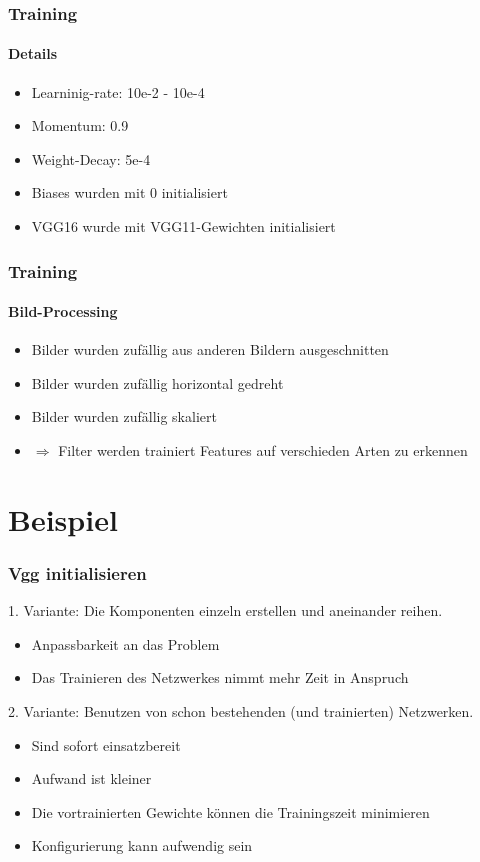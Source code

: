 \documentclass[10pt]{beamer}
\begin{document}
\begin{frame}
	\frametitle{Training}
	\framesubtitle{Details}
	\begin{itemize}
		\setlength\itemsep{1em}
		\item Learninig-rate: 10e-2 - 10e-4
		\item Momentum: 0.9
		\item Weight-Decay: 5e-4
		\item Biases wurden mit 0 initialisiert
		\item VGG16 wurde mit VGG11-Gewichten initialisiert
	\end{itemize}
\end{frame}

\begin{frame}
\frametitle{Training}
\framesubtitle{Bild-Processing}
\begin{itemize}
	\setlength\itemsep{1em}
	\item Bilder wurden zuf\"allig aus anderen Bildern ausgeschnitten
	\item Bilder wurden zuf\"allig horizontal gedreht
	\item Bilder wurden zuf\"allig skaliert
	\item[] $\Rightarrow$ Filter werden trainiert Features auf verschieden Arten zu erkennen 
\end{itemize}
\end{frame}

\section{Beispiel}

\begin{frame}
\frametitle{Vgg initialisieren}
	1. Variante: Die Komponenten einzeln erstellen und aneinander reihen.
	\begin{itemize}
		\item[] {\color{green} Anpassbarkeit an das Problem}
		\item[] {\color{red} Das Trainieren des Netzwerkes nimmt mehr Zeit in Anspruch}
 	\end{itemize}
	2. Variante: Benutzen von schon bestehenden (und trainierten) Netzwerken. 
	\begin{itemize}
		\item[] {\color{green} Sind sofort einsatzbereit}
		\item[] {\color{green} Aufwand ist kleiner}
		\item[] {\color{green} Die vortrainierten Gewichte k\"onnen die Trainingszeit minimieren}
		\item[] {\color{red} Konfigurierung kann aufwendig sein}
	\end{itemize}
\end{frame}
\end{document}
